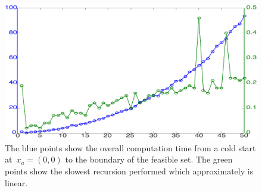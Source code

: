 \documentclass[journal]{IEEEtran}
\theoremstyle{remark}
\theoremstyle{definition}
\begin{document}
\begin{figure}
\centering
\includegraphics[width=\columnwidth]{ComputationTimes.pdf}
\caption{The \textcolor[rgb]{0,0,1}{blue points} show the overall computation time from a cold start 
at~$x_a=(0,0)$ to the boundary of the feasible set. The \textcolor[rgb]{0,.6,0}{green points} show the slowest recursion
performed which approximately is linear.}
\label{fig:computation:times}
\end{figure}




%
%

\end{document}

